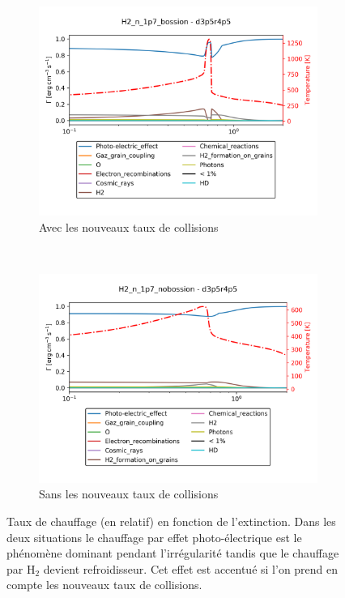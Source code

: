 \begin{figure}[!htbp]
    \centering
    \begin{subfigure}[t]{0.49\textwidth} %
        \centering \includegraphics[trim = {0 0 0 1cm},clip,width=1\textwidth]{figure/H2/rec_elec/H2_n_1p7_bossion_d3p5r4p5hc_rheat.png}
        \caption{Avec les nouveaux taux de collisions}
    \end{subfigure}
    ~ 
    \begin{subfigure}[t]{0.49\textwidth} %
        \centering \includegraphics[trim = {0 0 0 1cm},clip,width=1\textwidth]{figure/H2/rec_elec/H2_n_1p7_nobossion_d3p5r4p5hc_rheat.png}
        \caption{Sans les nouveaux taux de collisions}
    \end{subfigure}
    \caption{Taux de chauffage (en relatif) en fonction de l'extinction. Dans les deux situations le chauffage par effet photo-électrique est le phénomène dominant pendant l'irrégularité tandis que le chauffage par $\mathrm{H}_2$ devient refroidisseur. Cet effet est accentué si l'on prend en compte les nouveaux taux de collisions.}
    \label{fig:H2:recomb:profilH}
\end{figure}

